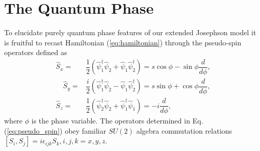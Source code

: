 \documentclass[aps, pre, preprint, groupedaddress, superscriptaddress, showkeys, showpacs] {revtex4-1}
\begin{document}
\section{The Quantum Phase \label{sec:quantum_phase}}

To elucidate purely quantum phase features of our extended Josephson model it is fruitful to recast Hamiltonian (\ref{eq:hamiltonian}) through the pseudo-spin operators defined as
% 
\begin{subequations}
\begin{align}
\hat{S}_x = & \dfrac{1}{2} (\hat{\psi}_1^\dag \hat{\psi}_2 + \hat{\psi}_1 \hat{\psi}_2^\dag) = s \cos{\phi} - \sin{\phi} \dfrac{d}{d \phi}, \\
\quad \hat{S}_y = & \dfrac{i}{2} (\hat{\psi}_1^\dag \hat{\psi}_2 - \hat{\psi}_1 \hat{\psi}_2^\dag) = s \sin{\phi} + \cos{\phi} \dfrac{d}{d \phi}, \\
\hat{S}_z = & \dfrac{1}{2} (\hat{\psi}_2^\dag \hat{\psi}_2 + \hat{\psi}_1^\dag \hat{\psi}_1) = -i\dfrac{d}{d \phi},
\end{align}
\label{eq:pseudo_spin}
\end{subequations}
%
where  $\phi$ is the phase variable.
The operators determined in Eq. (\ref{eq:pseudo_spin}) obey familiar $SU(2)$ algebra commutation relations $[S_i, S_j] = i\epsilon_{ijk}S_k,  i,j,k=x,y,z$.
\end{document}
